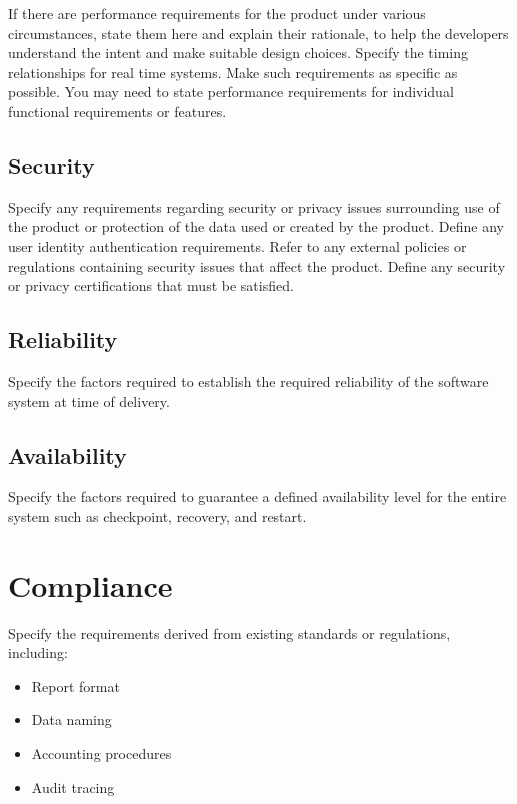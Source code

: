 If there are performance requirements for the product under various
circumstances, state them here and explain their rationale, to help the
developers understand the intent and make suitable design choices. Specify the
timing relationships for real time systems. Make such requirements as specific
as possible. You may need to state performance requirements for individual
functional requirements or features.

\subsection{Security}

Specify any requirements regarding security or privacy issues surrounding use of
the product or protection of the data used or created by the product. Define any
user identity authentication requirements. Refer to any external policies or
regulations containing security issues that affect the product. Define any
security or privacy certifications that must be satisfied.

\subsection{Reliability}

Specify the factors required to establish the required reliability of the
software system at time of delivery.

\subsection{Availability}

Specify the factors required to guarantee a defined availability level for the
entire system such as checkpoint, recovery, and restart.

\section{Compliance}

Specify the requirements derived from existing standards or regulations,
including:

\begin{itemize}
	\item Report format
	\item Data naming
	\item Accounting procedures
	\item Audit tracing
\end{itemize}

